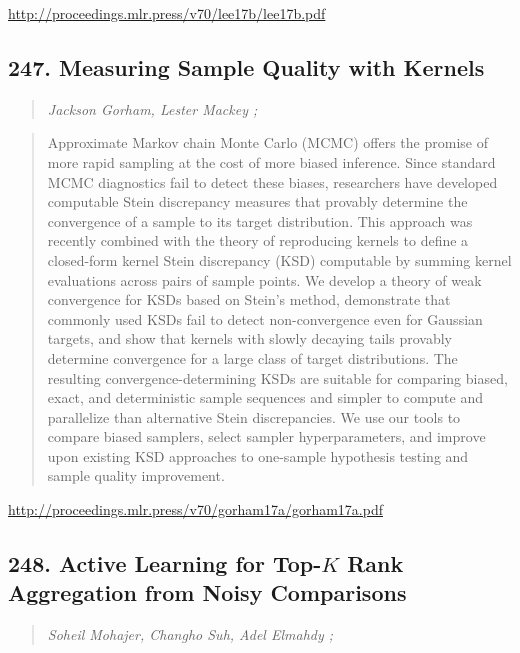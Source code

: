 \documentclass{article}
\begin{document}
\href{http://proceedings.mlr.press/v70/lee17b/lee17b.pdf}{http://proceedings.mlr.press/v70/lee17b/lee17b.pdf}

\subsection{247. Measuring Sample Quality with Kernels}

\begin{quote}
\footnotesize{\textit{Jackson Gorham, Lester Mackey ;}}

\end{quote}

\begin{quote}
    Approximate Markov chain Monte Carlo (MCMC) offers the promise of more rapid sampling at the cost of more biased inference. Since standard MCMC diagnostics fail to detect these biases, researchers have developed computable Stein discrepancy measures that provably determine the convergence of a sample to its target distribution. This approach was recently combined with the theory of reproducing kernels to define a closed-form kernel Stein discrepancy (KSD) computable by summing kernel evaluations across pairs of sample points. We develop a theory of weak convergence for KSDs based on Stein’s method, demonstrate that commonly used KSDs fail to detect non-convergence even for Gaussian targets, and show that kernels with slowly decaying tails provably determine convergence for a large class of target distributions. The resulting convergence-determining KSDs are suitable for comparing biased, exact, and deterministic sample sequences and simpler to compute and parallelize than alternative Stein discrepancies. We use our tools to compare biased samplers, select sampler hyperparameters, and improve upon existing KSD approaches to one-sample hypothesis testing and sample quality improvement.  
\end{quote}

\href{http://proceedings.mlr.press/v70/gorham17a/gorham17a.pdf}{http://proceedings.mlr.press/v70/gorham17a/gorham17a.pdf}

\subsection{248. Active Learning for Top-$K$ Rank Aggregation from Noisy Comparisons}

\begin{quote}
\footnotesize{\textit{Soheil Mohajer, Changho Suh, Adel Elmahdy ;}}

\end{quote}
\end{document}
